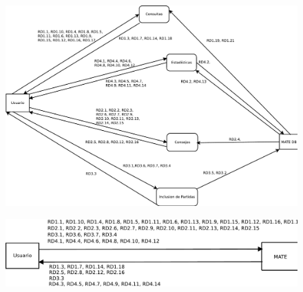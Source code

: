 \begin{figure}
\centering
\includegraphics[width=0.7\linewidth]{../../Diagramas/pdf/Armazon.pdf}
\caption[Diagrama Armazón]{}
\caption{}
\label{fig:Armazon}
\end{figure}


\begin{figure}
\centering
\includegraphics[width=0.7\linewidth]{../../Diagramas/pdf/CajaNegra.pdf}
\caption[Diagrama caja negra para el sistema MATE]{}
\caption{}
\label{fig:CajaNegra}
\end{figure}
